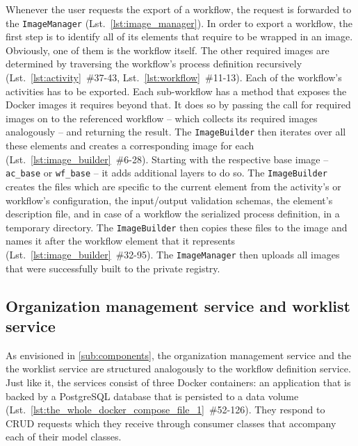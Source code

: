     Whenever the user requests the export of a workflow, the request is forwarded to the \texttt{ImageManager} (Lst.~\ref{lst:image_manager}).
    In order to export a workflow, the first step is to identify all of its elements that require to be wrapped in an image. Obviously, one of them is the workflow itself. The other required images are determined by traversing the workflow's process definition recursively (Lst.~\ref{lst:activity}~\#37-43, Lst.~\ref{lst:workflow}~\#11-13). Each of the workflow's activities has to be exported. Each sub-workflow has a method that exposes the Docker images it requires beyond that. It does so by passing the call for required images on to the referenced workflow -- which collects its required images analogously -- and returning the result. The \texttt{ImageBuilder} then iterates over all these elements and creates a corresponding image for each (Lst.~\ref{lst:image_builder}~\#6-28). Starting with the respective base image -- \texttt{ac\_base} or \texttt{wf\_base} -- it adds additional layers to do so. The \texttt{ImageBuilder} creates the files which are specific to the current element from the activity's or workflow's configuration, \ie the input/output validation schemas, the element's description file, and in case of a workflow the serialized process definition, in a temporary directory. The \texttt{ImageBuilder} then copies these files to the image and names it after the workflow element that it represents (Lst.~\ref{lst:image_builder}~\#32-95). The \texttt{ImageManager} then uploads all images that were successfully built to the private registry.

  \subsection{Organization management service and worklist service} %
    \label{sub:organization_management_service}
      As envisioned in \ref{sub:components}, the organization management service and the the worklist service are structured analogously to the workflow definition service. Just like it, the services consist of three Docker containers: an application that is backed by a PostgreSQL database that is persisted to a data volume (Lst.~\ref{lst:the_whole_docker_compose_file_1}~\#52-126). They respond to \ac{CRUD} requests which they receive through consumer classes that accompany each of their model classes.

